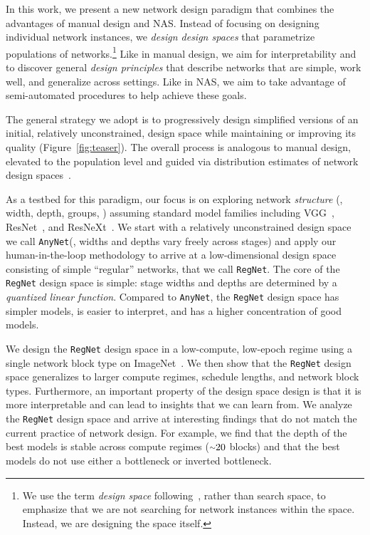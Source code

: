 \documentclass[10pt,twocolumn,letterpaper]{article}
\newcommand{\app}{\raise.17ex\hbox{$\scriptstyle\sim$}}
\newcommand{\dsname}[1]{\texttt{\small #1}\xspace}
\newcommand{\anynet}{\dsname{AnyNet}}
\newcommand{\regnet}{\dsname{RegNet}}
\begin{document}
In this work, we present a new network design paradigm that combines the advantages of manual design and NAS. Instead of focusing on designing individual network instances, we \emph{design design spaces} that parametrize populations of networks.\footnote{We use the term \emph{design space} following~\cite{Radosavovic2019}, rather than search space, to emphasize that we are not searching for network instances within the space. Instead, we are designing the space itself.} Like in manual design, we aim for interpretability and to discover general \emph{design principles} that describe networks that are simple, work well, and generalize across settings. Like in NAS, we aim to take advantage of semi-automated procedures to help achieve these goals.

The general strategy we adopt is to progressively design simplified versions of an initial, relatively unconstrained, design space while maintaining or improving its quality (Figure~\ref{fig:teaser}). The overall process is analogous to manual design, elevated to the population level and guided via distribution estimates of network design spaces~\cite{Radosavovic2019}.

As a testbed for this paradigm, our focus is on exploring network \emph{structure} (\eg, width, depth, groups, \etc) assuming standard model families including VGG~\cite{Simonyan2015}, ResNet~\cite{He2016}, and ResNeXt~\cite{Xie2017}. We start with a relatively unconstrained design space we call \anynet (\eg, widths and depths vary freely across stages) and apply our human-in-the-loop methodology to arrive at a low-dimensional design space consisting of simple ``regular'' networks, that we call \regnet. The core of the \regnet design space is simple: stage widths and depths are determined by a \emph{quantized linear function}. Compared to \anynet, the \regnet design space has simpler models, is easier to interpret, and has a higher concentration of good models.

We design the \regnet design space in a low-compute, low-epoch regime using a single network block type on ImageNet~\cite{Deng2009}. We then show that the \regnet design space generalizes to larger compute regimes, schedule lengths, and network block types. Furthermore, an important property of the design space design is that it is more interpretable and can lead to insights that we can learn from. We analyze the \regnet design space and arrive at interesting findings that do not match the current practice of network design. For example, we find that the depth of the best models is stable across compute regimes ($\app20$ blocks) and that the best models do not use either a bottleneck or inverted bottleneck.
\end{document}
